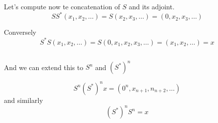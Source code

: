 \documentclass[a4paper,12pt]{article} %
\begin{document}
\subsection{}
Let's compute now te concatenation of \(S\) and its adjoint.
\[
    SS^*(x_1,x_2,\dots )=S(x_2,x_3, \dots  ) = (0,x_2,x_3, \dots  )
\]

Conversely
\[
    S^*S(x_1,x_2,\dots )=S(0,x_1,x_2,x_3, \dots  ) = (x_1,x_2, \dots  ) = x
\]

\subsection{}
And we can extend this to \(S^n\) and \((S^*)^n\)

\[
    S^n (S^*)^nx = (0^n,x_{n+1}, n_{n+2},\dots )
\]
and similarly
\[
    (S^*)^n S^n = x
\]
\end{document}

